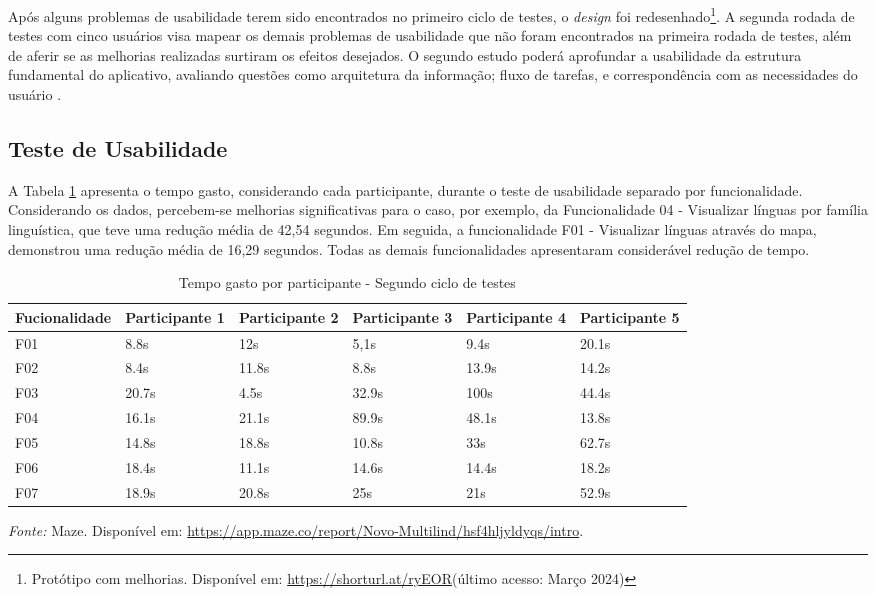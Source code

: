Após alguns problemas de usabilidade terem sido encontrados no primeiro ciclo de testes, o \textit{design} foi redesenhado\footnote{Protótipo com melhorias. Disponível em: \url{https://shorturl.at/ryEOR}(último acesso: Março 2024)}. 
A segunda rodada de testes com cinco usuários visa mapear os demais problemas de usabilidade que não foram encontrados na primeira rodada de testes, além de aferir se as melhorias realizadas surtiram os efeitos desejados. O segundo estudo poderá aprofundar a 
usabilidade da estrutura fundamental do aplicativo, avaliando questões como arquitetura da informação; fluxo de tarefas, e correspondência com as necessidades do usuário \cite{usabilitytest}.

\subsection{Teste de Usabilidade}
\label{sec:Segundo Teste de Usabilidade}
A Tabela \ref{tab07} apresenta o tempo gasto, considerando cada participante, durante o teste de usabilidade separado por funcionalidade. Considerando os dados, percebem-se melhorias significativas para o caso, por exemplo, da Funcionalidade 04 - Visualizar línguas 
por família linguística, que teve uma redução média de 42,54 segundos. Em seguida, a funcionalidade F01 - Visualizar línguas através do mapa, demonstrou uma redução média de 16,29 segundos. Todas as demais funcionalidades apresentaram considerável redução de 
tempo. 

\begin{table}[h!]
	\centering
	\caption{Tempo gasto por participante - Segundo ciclo de testes}
	\label{tab07}
	\begin{adjustbox}{center}
	\begin{tabular}{l|l|l|l|l|l}
	\hline
	Fucionalidade & Participante 1 & Participante 2 & Participante 3 & Participante 4 & Participante 5 \\ 	\hline
	F01                   & 8.8s     & 12s     & 5,1s      & 9.4s       & 20.1s      \\
	F02                   & 8.4s        & 11.8s      & 8.8s      & 13.9s    & 14.2s     \\
	F03                   & 20.7s        & 4.5s      & 32.9s      & 100s     & 44.4s     \\
	F04                   & 16.1s        & 21.1s     & 89.9s     & 48.1s     & 13.8s     \\
	F05                   & 14.8s      & 18.8s      & 10.8s     & 33s     & 62.7s     \\
	F06                   & 18.4s     & 11.1s      & 14.6s     & 14.4s     & 18.2s     \\
	F07                   & 18.9s     & 20.8s      & 25s     & 21s    & 52.9s       \\ 	\hline
	\end{tabular}
	\end{adjustbox}
	\begin{tablenotes}[flushleft]
		\centering
		\item \textit{Fonte:} Maze. Disponível em: \url{https://app.maze.co/report/Novo-Multilind/hsf4hljyldyqs/intro}.
	  \end{tablenotes}
\end{table}

